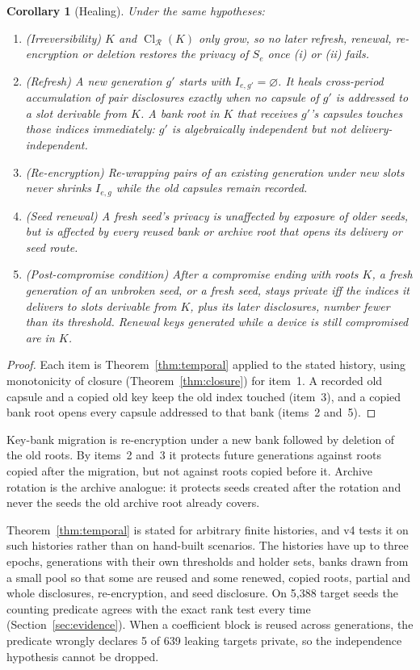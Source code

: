 \documentclass[pdflatex,sn-mathphys-num]{sn-jnl}
\theoremstyle{plain}
\newtheorem{corollary}[theorem]{Corollary}
\theoremstyle{definition}
\newcommand{\Cl}{\operatorname{Cl}}
\begin{document}
\begin{corollary}[Healing]\label{cor:healing}
Under the same hypotheses:
\begin{enumerate}
\item (Irreversibility) $K$ and $\Cl_{\mathcal R}(K)$ only grow, so no later refresh, renewal, re-encryption or deletion restores the privacy of $S_e$ once (i) or (ii) fails.
\item (Refresh) A new generation $g'$ starts with $I_{e,g'}=\varnothing$. It heals cross-period accumulation of pair disclosures exactly when no capsule of $g'$ is addressed to a slot derivable from $K$. A bank root in $K$ that receives $g'$'s capsules touches those indices immediately: $g'$ is algebraically independent but not delivery-independent.
\item (Re-encryption) Re-wrapping pairs of an existing generation under new slots never shrinks $I_{e,g}$ while the old capsules remain recorded.
\item (Seed renewal) A fresh seed's privacy is unaffected by exposure of older seeds, but is affected by every reused bank or archive root that opens its delivery or seed route.
\item (Post-compromise condition) After a compromise ending with roots $K$, a fresh generation of an unbroken seed, or a fresh seed, stays private iff the indices it delivers to slots derivable from $K$, plus its later disclosures, number fewer than its threshold. Renewal keys generated while a device is still compromised are in $K$.
\end{enumerate}
\end{corollary}
\begin{proof}
Each item is Theorem~\ref{thm:temporal} applied to the stated history, using monotonicity of closure (Theorem~\ref{thm:closure}) for item~1. A recorded old capsule and a copied old key keep the old index touched (item~3), and a copied bank root opens every capsule addressed to that bank (items~2 and~5).
\end{proof}

Key-bank migration is re-encryption under a new bank followed by deletion of the old roots. By items~2 and~3 it protects future generations against roots copied after the migration, but not against roots copied before it. Archive rotation is the archive analogue: it protects seeds created after the rotation and never the seeds the old archive root already covers.

Theorem~\ref{thm:temporal} is stated for arbitrary finite histories, and v4 tests it on such histories rather than on hand-built scenarios. The histories have up to three epochs, generations with their own thresholds and holder sets, banks drawn from a small pool so that some are reused and some renewed, copied roots, partial and whole disclosures, re-encryption, and seed disclosure. On 5,388 target seeds the counting predicate agrees with the exact rank test every time (Section~\ref{sec:evidence}). When a coefficient block is reused across generations, the predicate wrongly declares 5 of 639 leaking targets private, so the independence hypothesis cannot be dropped.
\end{document}
